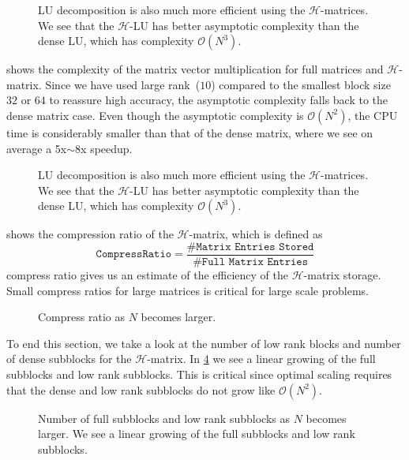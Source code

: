 \documentclass[10pt,a4paper]{article}
\theoremstyle{definition}
\begin{document}
\begin{figure}[htpb]
\centering
\scalebox{0.6}{}
\caption{LU decomposition is also much more efficient using the $\mathcal{H}$-matrices. We see that the $\mathcal{H}$-LU has better asymptotic complexity than the dense LU, which has complexity $\mathcal{O}(N^3)$.}
\label{fig:lu}
\end{figure}

 shows the complexity of the matrix vector multiplication for full matrices and $\mathcal{H}$-matrix. Since we have used large rank~($10$) compared to the smallest block size $32$ or $64$ to reassure high accuracy, the asymptotic complexity falls back to the dense matrix case. Even though the asymptotic complexity is $\mathcal{O}(N^2)$, the CPU time is considerably smaller than that of the dense matrix, where we see on average a 5x$\sim$8x speedup. 

\begin{figure}[htpb]
\centering
\scalebox{0.6}{}
\caption{LU decomposition is also much more efficient using the $\mathcal{H}$-matrices. We see that the $\mathcal{H}$-LU has better asymptotic complexity than the dense LU, which has complexity $\mathcal{O}(N^3)$.}
\label{fig:matvec}
\end{figure}

 shows the compression ratio of the $\mathcal{H}$-matrix, which is defined as
\begin{equation}
\texttt{CompressRatio}=\frac{\#\texttt{Matrix Entries Stored}}{\#\texttt{Full Matrix Entries}}
\end{equation}
compress ratio gives us an estimate of the efficiency of the $\mathcal{H}$-matrix storage. Small compress ratios for large matrices is critical for large scale problems. 

\begin{figure}[htpb]
\centering
\scalebox{0.6}{}
\caption{Compress ratio as $N$ becomes larger.}
\label{fig:compress}
\end{figure}

To end this section, we take a look at the number of low rank blocks and number of dense subblocks for the $\mathcal{H}$-matrix. In \cref{fig:dense} we see a linear growing of the full subblocks and low rank subblocks. This is critical since optimal scaling requires that the dense and low rank subblocks do not grow like $\mathcal{O}(N^2)$. 

\begin{figure}[htpb]
\centering
\scalebox{0.6}{}
\caption{Number of full subblocks and low rank subblocks as $N$ becomes larger. We see a linear growing of the full subblocks and low rank subblocks.}
\label{fig:dense}
\end{figure}
\end{document}
